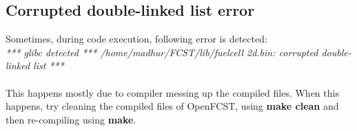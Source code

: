 \subsection{Corrupted double-linked list error}
Sometimes, during code execution, following error is detected:\\
\textit{*** glibc detected *** /home/madhur/FCST/lib/fuelcell 2d.bin: corrupted double-linked list ***}\\\\
This happens mostly due to compiler messing up the compiled files. When this happens, try cleaning the compiled files of OpenFCST, using \textbf{make clean} and then re-compiling using \textbf{make}.


